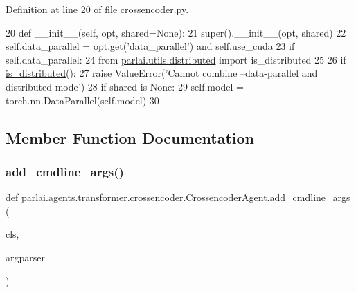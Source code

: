 Definition at line 20 of file crossencoder.\+py.


\begin{DoxyCode}
20     \textcolor{keyword}{def }\_\_init\_\_(self, opt, shared=None):
21         super().\_\_init\_\_(opt, shared)
22         self.data\_parallel = opt.get(\textcolor{stringliteral}{'data\_parallel'}) \textcolor{keywordflow}{and} self.use\_cuda
23         \textcolor{keywordflow}{if} self.data\_parallel:
24             \textcolor{keyword}{from} \hyperlink{namespaceparlai_1_1utils_1_1distributed}{parlai.utils.distributed} \textcolor{keyword}{import} is\_distributed
25 
26             \textcolor{keywordflow}{if} \hyperlink{namespaceparlai_1_1utils_1_1distributed_a023acb5e3b66e1f27e21247c35661279}{is\_distributed}():
27                 \textcolor{keywordflow}{raise} ValueError(\textcolor{stringliteral}{'Cannot combine --data-parallel and distributed mode'})
28             \textcolor{keywordflow}{if} shared \textcolor{keywordflow}{is} \textcolor{keywordtype}{None}:
29                 self.model = torch.nn.DataParallel(self.model)
30 
\end{DoxyCode}


\subsection{Member Function Documentation}
\mbox{\label{classparlai_1_1agents_1_1transformer_1_1crossencoder_1_1CrossencoderAgent_a931cdceebd1eceb9c20638271c86af7a}} 
\subsubsection{\texorpdfstring{add\+\_\+cmdline\+\_\+args()}{add\_cmdline\_args()}}
{\footnotesize\ttfamily def parlai.\+agents.\+transformer.\+crossencoder.\+Crossencoder\+Agent.\+add\+\_\+cmdline\+\_\+args (\begin{DoxyParamCaption}\item[{}]{cls,  }\item[{}]{argparser }\end{DoxyParamCaption})}


